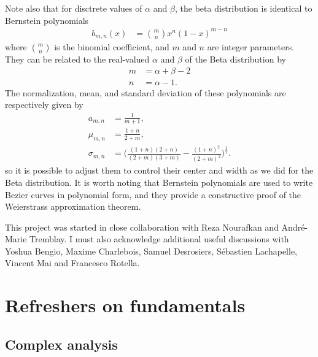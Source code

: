 \documentclass[notitlepage,11pt,nofootinbib]{revtex4-1}
\begin{document}
Note also that for disctrete values of $\alpha$ and $\beta$, the beta distribution is identical to Bernstein polynomials
\begin{align}
b_{m,n}(x)
&=
\binom{m}{n} x^n(1-x)^{m-n}
\end{align}
where $\binom{m}{n}$ is the binomial coefficient, and $m$ and $n$ are integer parameters. They can be related to the real-valued $\alpha$ and $\beta$ of the Beta distribution by
\begin{align}
m &= \alpha+\beta-2
\\
n &= \alpha-1.
\end{align}
The normalization, mean, and standard deviation of these polynomials are respectively given by
\begin{align}
a_{m,n}
&=
\frac{1}{m+1},
\\
\mu_{m,n}
&=
\frac{1+n}{2+m},
\\
\sigma_{m,n}
&=
\bigg(
\frac{(1+n)(2+n)}{(2+m)(3+m)}
-
\frac{(1+n)^2}{(2+m)^2}
\bigg)^{\frac{1}{2}}.
\end{align}
so it is possible to adjust them to control their center and width as we did for the Beta distribution. It is worth noting that Bernstein polynomials are used to write Bezier curves in polynomial form, and they provide a constructive proof of the Weierstrass approximation theorem.



\begin{acknowledgments}
This project was started in close collaboration with Reza Nourafkan and André-Marie Tremblay. I must also acknowledge additional useful discussions with Yoshua Bengio, Maxime Charlebois, Samuel Desrosiers, Sébastien Lachapelle, Vincent Mai and Francesco Rotella.
\end{acknowledgments}


    
\pagebreak

\appendix
{} %


\section{Refreshers on fundamentals}

\subsection{Complex analysis}
\end{document}
